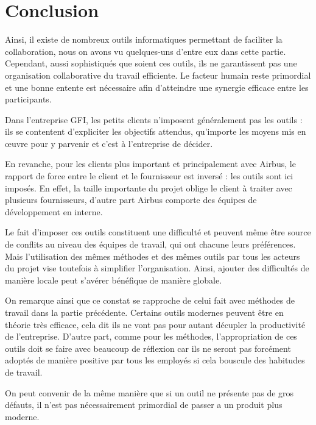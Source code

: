 \section{Conclusion}

Ainsi, il existe de nombreux outils informatiques permettant de faciliter la collaboration, nous on avons vu quelques-uns d'entre eux dans cette partie. Cependant, aussi sophistiqués que soient ces outils, ils ne garantissent pas une organisation collaborative du travail efficiente. Le facteur humain reste primordial et une bonne entente est nécessaire afin d’atteindre une synergie efficace entre les participants.

\begin{app}
Dans l'entreprise GFI, les petits clients n'imposent généralement pas les outils : ils se contentent d'expliciter les objectifs attendus, qu'importe les moyens mis en œuvre pour y parvenir et c'est à l'entreprise de décider.

En revanche, pour les clients plus important et principalement avec Airbus, le rapport de force entre le client et le fournisseur est inversé : les outils sont ici imposés. En effet, la taille importante du projet oblige le client à traiter avec plusieurs fournisseurs, d'autre part Airbus comporte des équipes de développement en interne.
\end{app}

Le fait d'imposer ces outils constituent une difficulté et peuvent même être source de conflits au niveau des équipes de travail, qui ont chacune leurs préférences. Mais l'utilisation des mêmes méthodes et des mêmes outils par tous les acteurs du projet vise toutefois à simplifier l'organisation. Ainsi, ajouter des difficultés de manière locale peut s'avérer bénéfique de manière globale.

On remarque ainsi que ce constat se rapproche de celui fait avec méthodes de travail dans la partie précédente. Certains outils modernes peuvent être en théorie très efficace, cela dit ils ne vont pas pour autant décupler la productivité de l'entreprise. D'autre part, comme pour les méthodes, l'appropriation de ces outils doit se faire avec beaucoup de réflexion car ils ne seront pas forcément adoptés de manière positive par tous les employés si cela bouscule des habitudes de travail.

On peut convenir de la même manière que si un outil ne présente pas de gros défauts, il n'est pas nécessairement primordial de passer a un produit plus moderne.
